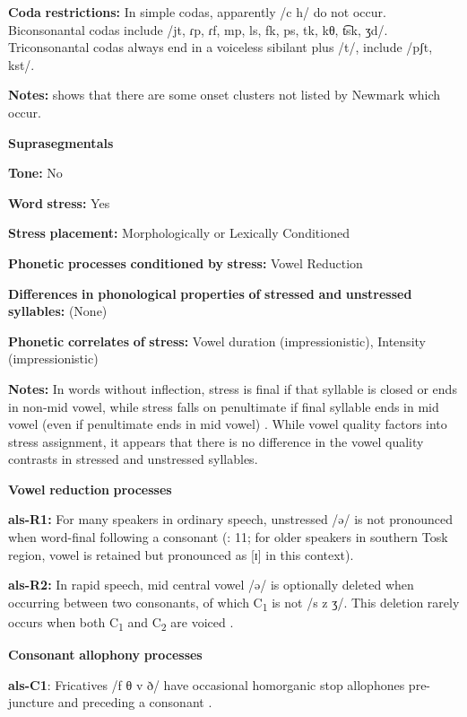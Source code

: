 \begin{styleBody}
\textbf{Coda} \textbf{restrictions:} In simple codas, apparently /c h/ do not occur. Biconsonantal codas include /jt, ɾp, ɾf, mp, ls, fk, ps, tk,  kθ, t͡sk, ʒd/. Triconsonantal codas always end in a voiceless sibilant plus /t/, include /pʃt, kst/.

\textbf{Notes:} \citet{Klippenstein2010} shows that there are some onset clusters not listed by Newmark which occur.

\textbf{Suprasegmentals}

\textbf{Tone:} No

\textbf{Word} \textbf{stress:} Yes

\textbf{Stress} \textbf{placement:} Morphologically or Lexically Conditioned

\textbf{Phonetic} \textbf{processes} \textbf{conditioned} \textbf{by} \textbf{stress:} Vowel Reduction

\textbf{Differences} \textbf{in} \textbf{phonological} \textbf{properties} \textbf{of} \textbf{stressed} \textbf{and} \textbf{unstressed} \textbf{syllables:} (None)

\textbf{Phonetic} \textbf{correlates} \textbf{of} \textbf{stress:} Vowel duration (impressionistic), Intensity (impressionistic)

\textbf{Notes:} In words without inflection, stress is final if that syllable is closed or ends in non-mid vowel, while stress falls on penultimate if final syllable ends in mid vowel (even if penultimate ends in mid vowel) \citep{Trommer2013}. While vowel quality factors into stress assignment, it appears that there is no difference in the vowel quality contrasts in stressed and unstressed syllables.

\textbf{Vowel} \textbf{reduction} \textbf{processes}

\textbf{als-R1:} For many speakers in ordinary speech, unstressed /ə/ is not pronounced when word-final following a consonant (\citealt{NewmarkEtAl1982}: 11; for older speakers in southern Tosk region, vowel is retained but pronounced as [ɪ] in this context).

\textbf{als-R2:} In rapid speech, mid central vowel /ə/ is optionally deleted when occurring between two consonants, of which C\textsubscript{1} is not /s z ʒ/. This deletion rarely occurs when both C\textsubscript{1} and C\textsubscript{2} are voiced \citep[21-2]{Klippenstein2010}.

\textbf{Consonant} \textbf{allophony} \textbf{processes}

\textbf{als-C1}: Fricatives /f θ v ð/ have occasional homorganic stop allophones pre-juncture and preceding a consonant \citep{Newmark1957}.


\end{styleBody}
